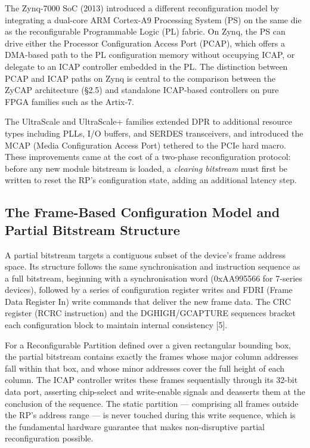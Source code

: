 The Zynq-7000 SoC (2013) introduced a different reconfiguration model by integrating a dual-core ARM Cortex-A9 Processing System (PS) on the same die as the reconfigurable Programmable Logic (PL) fabric. On Zynq, the PS can drive either the Processor Configuration Access Port (PCAP), which offers a DMA-based path to the PL configuration memory without occupying ICAP, or delegate to an ICAP controller embedded in the PL. The distinction between PCAP and ICAP paths on Zynq is central to the comparison between the ZyCAP architecture (§2.5) and standalone ICAP-based controllers on pure FPGA families such as the Artix-7.

The UltraScale and UltraScale+ families extended DPR to additional resource types including PLLs, I/O buffers, and SERDES transceivers, and introduced the MCAP (Media Configuration Access Port) tethered to the PCIe hard macro. These improvements came at the cost of a two-phase reconfiguration protocol: before any new module bitstream is loaded, a \textit{clearing bitstream} must first be written to reset the RP's configuration state, adding an additional latency step.

\subsection{The Frame-Based Configuration Model and Partial Bitstream Structure}

A partial bitstream targets a contiguous subset of the device's frame address space. Its structure follows the same synchronisation and instruction sequence as a full bitstream, beginning with a synchronisation word (0xAA995566 for 7-series devices), followed by a series of configuration register writes and FDRI (Frame Data Register In) write commands that deliver the new frame data. The CRC register (RCRC instruction) and the DGHIGH/GCAPTURE sequences bracket each configuration block to maintain internal consistency [5].

For a Reconfigurable Partition defined over a given rectangular bounding box, the partial bitstream contains exactly the frames whose major column addresses fall within that box, and whose minor addresses cover the full height of each column. The ICAP controller writes these frames sequentially through its 32-bit data port, asserting chip-select and write-enable signals and deasserts them at the conclusion of the sequence. The static partition — comprising all frames outside the RP's address range — is never touched during this write sequence, which is the fundamental hardware guarantee that makes non-disruptive partial reconfiguration possible.


